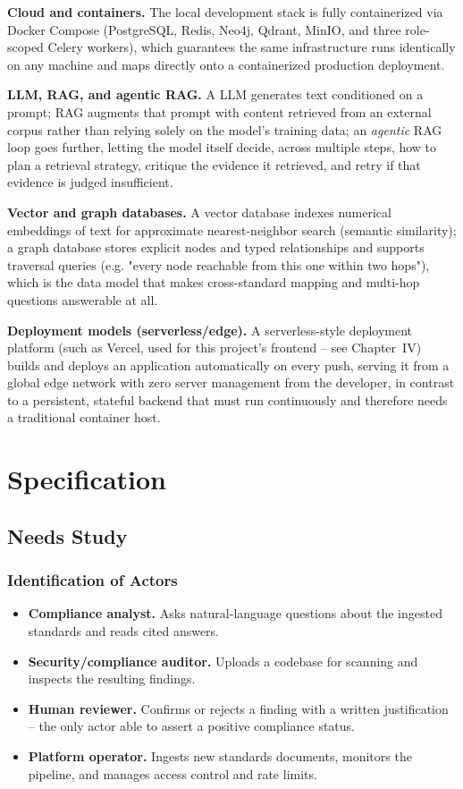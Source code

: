 \documentclass[12pt,a4paper]{report}
\begin{document}
\textbf{Cloud and containers.} The local development stack is fully
containerized via Docker Compose (PostgreSQL, Redis, Neo4j, Qdrant, MinIO,
and three role-scoped Celery workers), which guarantees the same
infrastructure runs identically on any machine and maps directly onto a
containerized production deployment.

\textbf{\ac{LLM}, \ac{RAG}, and agentic \ac{RAG}.} A \ac{LLM} generates text
conditioned on a prompt; \ac{RAG} augments that prompt with content
retrieved from an external corpus rather than relying solely on the model's
training data; an \emph{agentic} \ac{RAG} loop goes further, letting the
model itself decide, across multiple steps, how to plan a retrieval
strategy, critique the evidence it retrieved, and retry if that evidence is
judged insufficient.

\textbf{Vector and graph databases.} A vector database indexes numerical
embeddings of text for approximate nearest-neighbor search (semantic
similarity); a graph database stores explicit nodes and typed relationships
and supports traversal queries (e.g. "every node reachable from this one
within two hops"), which is the data model that makes cross-standard mapping
and multi-hop questions answerable at all.

\textbf{Deployment models (serverless/edge).} A serverless-style deployment
platform (such as Vercel, used for this project's frontend -- see
Chapter~IV) builds and deploys an application automatically on every push,
serving it from a global edge network with zero server management from the
developer, in contrast to a persistent, stateful backend that must run
continuously and therefore needs a traditional container host.

\section{Specification}

\subsection{Needs Study}

\subsubsection{Identification of Actors}

\begin{itemize}
  \item \textbf{Compliance analyst.} Asks natural-language questions about
        the ingested standards and reads cited answers.
  \item \textbf{Security/compliance auditor.} Uploads a codebase for
        scanning and inspects the resulting findings.
  \item \textbf{Human reviewer.} Confirms or rejects a finding with a
        written justification -- the only actor able to assert a positive
        compliance status.
  \item \textbf{Platform operator.} Ingests new standards documents,
        monitors the pipeline, and manages access control and rate limits.
\end{itemize}
\end{document}
